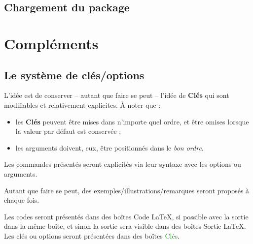 \documentclass[a4paper]{article}
\newcommand\Cle[1]{{\bfseries\sffamily\textlangle #1\textrangle}}
\begin{document}
\subsection{Chargement du package}



\section{Compléments}

\subsection{Le système de \og clés/options \fg}

\begin{codeidee}
L'idée est de conserver -- autant que faire se peut -- l'idée de \Cle{Clés} qui sont modifiables et relativement explicites. À noter que :
%
\begin{itemize}[leftmargin=*]
  \item les \Cle{Clés} peuvent être mises dans n'importe quel ordre, et être omises lorsque la valeur par défaut est conservée ;
  \item les \textsf{arguments} doivent, eux, être positionnés dans le \textit{bon ordre}.
\end{itemize}
\end{codeidee}

\begin{codeinfo}
Les \textsf{commandes} présentés seront explicités via leur \textsf{syntaxe} avec les \textsf{options} ou \textsf{arguments}.

Autant que faire se peut, des exemples/illustrations/remarques seront proposés à chaque fois.

\smallskip

Les \textsf{codes} seront présentés dans des \textsf{boîtes} \textcolor{red!75!black}{{\small \faCode} Code \LaTeX}, si possible avec la \textsf{sortie} dans la même boîte, et sinon la \textsf{sortie} sera visible dans des \textsf{boîtes} \textcolor{red!75!black}{{\small \faArrowAltCircleRight[regular]} Sortie \LaTeX}. Les \textsf{clés} ou \textsf{options} seront présentées dans des \textsf{boîtes} \textcolor{ForestGreen}{{\small \faPaperclip} Clés}.
\end{codeinfo}
\end{document}
